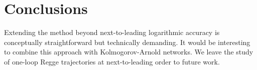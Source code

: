 \section{Conclusions}\label{sec:conclusions}

Extending the method beyond next-to-leading logarithmic accuracy is
conceptually straightforward but technically demanding. It would be
interesting to combine this approach with Kolmogorov-Arnold networks. We
leave the study of one-loop Regge trajectories at next-to-leading order
to future work.

